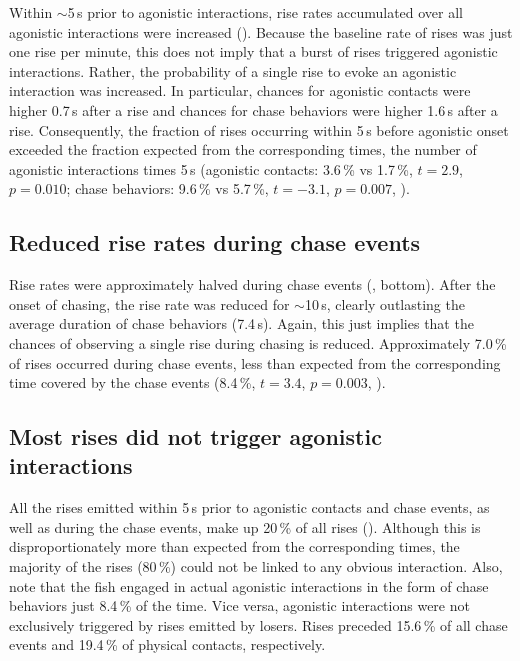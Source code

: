Within $\sim$5\,s prior to agonistic interactions, rise rates accumulated over all agonistic interactions were increased (). Because the baseline rate of rises was just one rise per minute, this does not imply that a burst of rises triggered agonistic interactions. Rather, the probability of a single rise to evoke an agonistic interaction was increased. In particular, chances for agonistic contacts were higher 0.7\,s after a rise and chances for chase behaviors were higher 1.6\,s after a rise. Consequently, the fraction of rises occurring within 5\,s before agonistic onset exceeded the fraction expected from the corresponding times, the number of agonistic interactions times 5\,s (agonistic contacts: 3.6\,\% vs 1.7\,\%, $t=2.9$, $p=0.010$; chase behaviors: 9.6\,\% vs 5.7\,\%, $t=-3.1$, $p=0.007$, ).

\subsection{Reduced rise rates during chase events}

Rise rates were approximately halved during chase events (, bottom). After the onset of chasing, the rise rate was reduced for $\sim$10\,s, clearly outlasting the average duration of chase behaviors (7.4\,s). Again, this just implies that the chances of observing a single rise during chasing is reduced. Approximately 7.0\,\% of rises occurred during chase events, less than expected from the corresponding time covered by the chase events (8.4\,\%, $t=3.4$, $p=0.003$, ).

\subsection{Most rises did not trigger agonistic interactions}
All the rises emitted within 5\,s prior to agonistic contacts and chase events, as well as during the chase events, make up 20\,\% of all rises (). Although this is disproportionately more than expected from the corresponding times, the majority of the rises (80\,\%) could not be linked to any obvious interaction. Also, note that the fish engaged in actual agonistic interactions in the form of chase behaviors just 8.4\,\% of the time. Vice versa, agonistic interactions were not exclusively triggered by rises emitted by losers. Rises preceded 15.6\,\% of all chase events and 19.4\,\% of physical contacts,
respectively.


